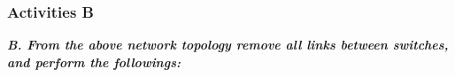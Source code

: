 \documentclass[a4paper,11pt]{article}
\begin{document}
\pagebreak
%
%
%
%


%
%
%




\subsubsection{Activities B}

{\bfseries \textit{B. From the above network topology remove all links between switches, and perform the
        followings:}}
\end{document}
